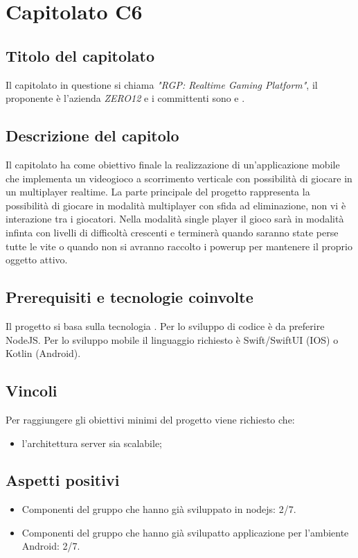 \section{Capitolato C6}
\subsection{Titolo del capitolato}
Il capitolato in questione si chiama \textit{"RGP: Realtime Gaming Platform"}, il proponente \`e l'azienda \textit{ZERO12} e i committenti sono \VT{} e \CR{}.

\subsection{Descrizione del capitolo}
Il capitolato ha come obiettivo finale la realizzazione di un'applicazione mobile che implementa un videogioco a scorrimento verticale con possibilità di giocare in un multiplayer realtime. La parte principale del progetto rappresenta la possibilità di giocare in modalità multiplayer con sfida ad eliminazione, non vi è interazione tra i giocatori. Nella modalità single player il gioco sarà in modalità infinta con livelli di difficoltà crescenti e terminerà quando saranno state perse tutte le vite o quando non si avranno raccolto i powerup per mantenere il proprio oggetto attivo.

\subsection{Prerequisiti e tecnologie coinvolte}
Il progetto si basa sulla tecnologia .
Per lo sviluppo di codice è da preferire NodeJS.
Per lo sviluppo mobile il linguaggio richiesto è Swift/SwiftUI (IOS) o Kotlin (Android).

\subsection{Vincoli}
Per raggiungere gli obiettivi minimi del progetto viene richiesto che:

\begin{itemize}
\item l'architettura server sia scalabile;
\end{itemize}


\subsection{Aspetti positivi}
\begin{itemize}
\item Componenti del gruppo che hanno già sviluppato in nodejs: 2/7.
\item Componenti del gruppo che hanno già svilupatto applicazione per l'ambiente Android: 2/7.
\end{itemize}

